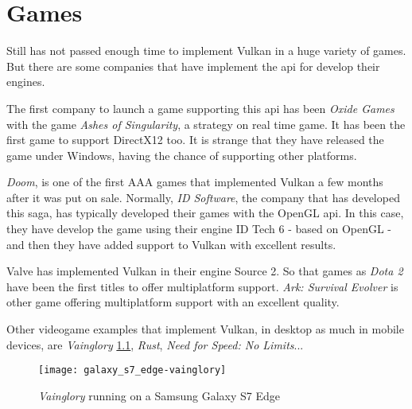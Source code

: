 \chapter{Games}
Still has not passed enough time to implement Vulkan in a huge variety of games. But there are some companies that
have implement the \gls{api} for develop their engines.

The first company to launch a game supporting this \gls{api} has been \emph{Oxide Games} with the game \emph{Ashes of
Singularity}, a strategy on real time game. It has been the first game to support DirectX12 too. It is strange that
they have released the game under Windows, having the chance of supporting other platforms.

\emph{Doom}, is one of the first AAA games that implemented Vulkan a few months after it was put on sale. Normally,
\emph{ID Software}, the company that has developed this saga, has typically developed their games with the OpenGL
\gls{api}. In this case, they have develop the game using their engine ID Tech 6 - based on OpenGL - and then they
have added support to Vulkan with excellent results.

Valve has implemented Vulkan in their engine Source 2. So that games as \emph{Dota 2} have been the first titles to
offer multiplatform support. \emph{Ark: Survival Evolver} is other game offering multiplatform support with an
excellent quality.

Other videogame examples that implement Vulkan, in desktop as much in mobile devices, are \emph{Vainglory}
\ref{fig:vainglory}, \emph{Rust}, \emph{Need for Speed: No Limits}...

\begin{figure}[t]
	\begin{center}
		\texttt{[image: galaxy\_s7\_edge-vainglory]}
		\caption{\emph{Vainglory} running on a Samsung Galaxy S7 Edge}
		\label{fig:vainglory}
	\end{center}
\end{figure}
